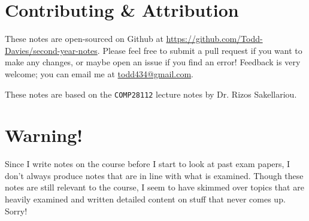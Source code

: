 \section*{Contributing \& Attribution}

These notes are open-sourced on Github at
\url{https://github.com/Todd-Davies/second-year-notes}. Please feel free to
submit a pull request if you want to make any changes, or maybe open an issue
if you find an error! Feedback is very welcome; you can email me at
\href{mailto:todd434@gmail.com}{todd434@gmail.com}.

These notes are based on the \texttt{COMP28112} lecture notes by Dr. Rizos
Sakellariou.

\section*{Warning!}

Since I write notes on the course before I start to look at past exam papers, I
don't always produce notes that are in line with what is examined. Though these
notes are still relevant to the course, I seem to have skimmed over topics that
are heavily examined and written detailed content on stuff that never comes up.
Sorry!
